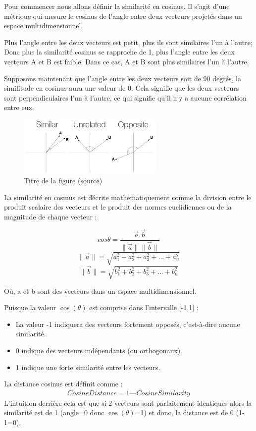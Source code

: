 Pour commencer nous allons définir la similarité en cosinus. Il s'agit d'une métrique qui mesure le cosinus de l'angle entre deux vecteurs projetés dans un espace multidimensionnel.


Plus l'angle entre les deux vecteurs est petit, plus ils sont similaires l'un à l'autre; Donc plus la similarité cosinus se rapproche de 1, plus l'angle entre les deux vecteurs A et B est faible. Dans ce cas, A et B sont plus similaires l'un à l'autre.


Supposons maintenant que l'angle entre les deux vecteurs soit de 90 degrés, la similitude en cosinus aura une valeur de 0. Cela signifie que les deux vecteurs sont perpendiculaires l'un à l'autre, ce qui signifie qu'il n'y a aucune corrélation entre eux.


\begin{figure}[h!]
	\begin{center}
		\caption{Titre de la figure (source)}
		\includegraphics[width=200pt]{./img/notions_math/metric/img_metric_cos.png}
	\end{center}
\end{figure}

La similarité en cosinus est décrite mathématiquement comme la division entre le produit scalaire des vecteurs et le produit des normes euclidiennes ou de la magnitude de chaque vecteur :


$$ cos \theta = \frac{\vec{a}.\vec{b}}{\parallel\vec{a} \parallel\parallel  \vec{b}\parallel}$$
$$\parallel \vec{a} \parallel = \sqrt{a_1^2 + a_2^2 + a_3^2 + \dots +a_n^2}$$
$$\parallel \vec{b} \parallel = \sqrt{b_1^2 + b_2^2 + b_3^2 + \dots +b_n^2}$$

Où, a et b sont des vecteurs dans un espace multidimensionnel.


Puisque la valeur $\cos(\theta)$ est comprise dans l'intervalle [-1,1] :
\begin{itemize}
    \item La valeur -1 indiquera des vecteurs fortement opposés, c'est-à-dire aucune similarité.
    \item 0 indique des vecteurs indépendants (ou orthogonaux).
    \item 1 indique une forte similarité entre les vecteurs.
\end{itemize}
La distance cosinus est définit comme :
\begin{eqnarray}
    Cosine Distance = 1 — Cosine Similarity
\end{eqnarray}
L'intuition derrière cela est que si 2 vecteurs sont parfaitement identiques alors la similarité est de 1 (angle=0 donc $\cos(\theta)$=1) et donc, la distance est de 0 (1-1=0).


